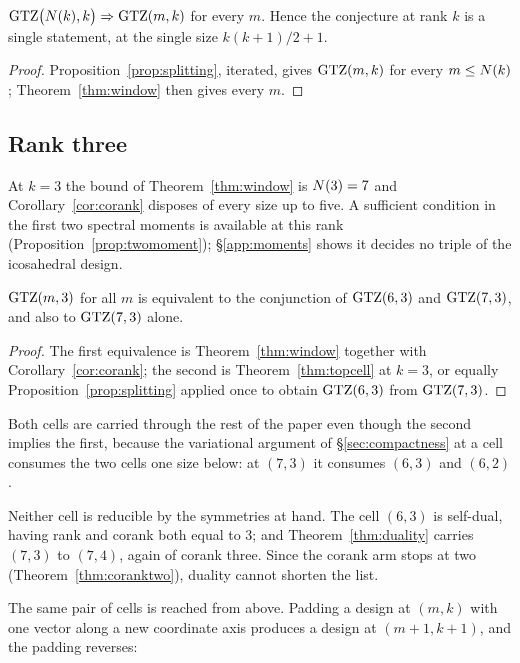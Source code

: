 \begin{theorem}[Lean]\label{thm:topcell}
$\mathrm{GTZ}\bigl(N(k),k\bigr)\Rightarrow\mathrm{GTZ}(m,k)$ for every $m$.  Hence the
conjecture at rank $k$ is a single statement, at the single size
$k(k+1)/2+1$.
\end{theorem}

\begin{proof}
Proposition~\ref{prop:splitting}, iterated, gives $\mathrm{GTZ}(m,k)$ for every
$m\le N(k)$; Theorem~\ref{thm:window} then gives every $m$.
\end{proof}

\subsection{Rank three}\label{sec:rankthree}

At $k=3$ the bound of Theorem~\ref{thm:window} is $N(3)=7$ and
Corollary~\ref{cor:corank} disposes of every size up to five.  A
sufficient condition in the first two spectral moments is available at
this rank (Proposition~\ref{prop:twomoment}); \S\ref{app:moments} shows
it decides no triple of the icosahedral design.

\begin{corollary}[Lean]\label{cor:twocells}
$\mathrm{GTZ}(m,3)$ for all $m$ is equivalent to the conjunction of $\mathrm{GTZ}(6,3)$
and $\mathrm{GTZ}(7,3)$, and also to $\mathrm{GTZ}(7,3)$ alone.
\end{corollary}

\begin{proof}
The first equivalence is Theorem~\ref{thm:window} together with
Corollary~\ref{cor:corank}; the second is Theorem~\ref{thm:topcell} at
$k=3$, or equally Proposition~\ref{prop:splitting} applied once to obtain
$\mathrm{GTZ}(6,3)$ from $\mathrm{GTZ}(7,3)$.
\end{proof}

Both cells are carried through the rest of the paper even though the
second implies the first, because the variational argument of
\S\ref{sec:compactness} at a cell consumes the two cells one size below:
at $(7,3)$ it consumes $(6,3)$ and $(6,2)$.

Neither cell is reducible by the symmetries at hand.  The cell $(6,3)$ is
self-dual, having rank and corank both equal to $3$; and
Theorem~\ref{thm:duality} carries $(7,3)$ to $(7,4)$, again of corank
three.  Since the corank arm stops at two
(Theorem~\ref{thm:coranktwo}), duality cannot shorten the list.

The same pair of cells is reached from above.  Padding a design at $(m,k)$
with one vector along a new coordinate axis produces a design at
$(m+1,k+1)$, and the padding reverses:

